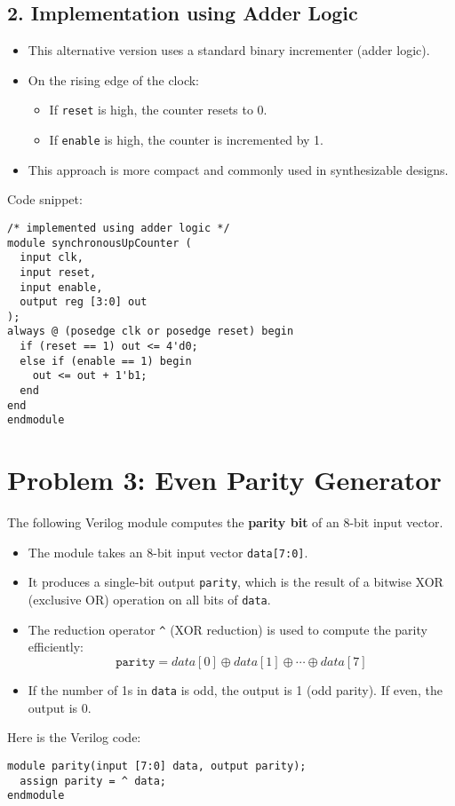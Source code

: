 \documentclass{article}
\begin{document}
\subsection*{2. Implementation using Adder Logic}
\begin{itemize}
	\item This alternative version uses a standard binary incrementer (adder logic).
	\item On the rising edge of the clock:
	      \begin{itemize}
		      \item If \texttt{reset} is high, the counter resets to 0.
		      \item If \texttt{enable} is high, the counter is incremented by 1.
	      \end{itemize}
	\item This approach is more compact and commonly used in synthesizable designs.
\end{itemize}

\noindent Code snippet:

\begin{lstlisting}
/* implemented using adder logic */
module synchronousUpCounter (
  input clk, 
  input reset, 
  input enable, 
  output reg [3:0] out
);
always @ (posedge clk or posedge reset) begin
  if (reset == 1) out <= 4'd0;
  else if (enable == 1) begin
    out <= out + 1'b1;
  end
end
endmodule
\end{lstlisting}

\section*{Problem 3: Even Parity Generator}

The following Verilog module computes the \textbf{parity bit} of an 8-bit input vector.

\begin{itemize}
	\item The module takes an 8-bit input vector \texttt{data[7:0]}.
	\item It produces a single-bit output \texttt{parity}, which is the result of a bitwise XOR (exclusive OR) operation on all bits of \texttt{data}.
	\item The reduction operator \texttt{\^{}} (XOR reduction) is used to compute the parity efficiently:
	      \[
		      \texttt{parity} = data[0] \oplus data[1] \oplus \cdots \oplus data[7]
	      \]
	\item If the number of 1s in \texttt{data} is odd, the output is 1 (odd parity). If even, the output is 0.
\end{itemize}

\noindent Here is the Verilog code:

\begin{lstlisting}
module parity(input [7:0] data, output parity);
  assign parity = ^ data;
endmodule
\end{lstlisting}
\end{document}

